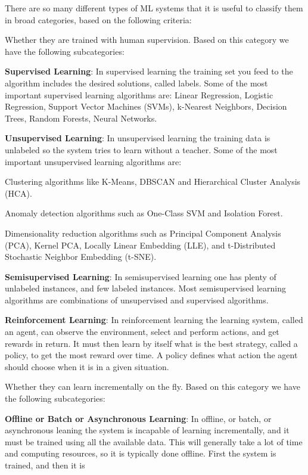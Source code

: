 There are so many different types of ML systems that it is useful to classify them in broad categories,
based on the following criteria:
\ben
\item Whether they are trained with human supervision. Based on this category we have the following
subcategories:
\bit
\item \textbf{Supervised Learning}: In supervised learning the training set you feed to the algorithm includes the
desired solutions, called labels. Some of the most important supervised learning algorithms are: Linear Regression,
Logistic Regression, Support Vector Machines (SVMs), k-Nearest Neighbors, Decision Trees, Random Forests, Neural
Networks.
\item \textbf{Unsupervised Learning}: In unsupervised learning the training data is unlabeled so the system tries to
learn without a teacher. Some of the most important unsupervised learning algorithms are:
\bit
\item Clustering algorithms like K-Means, DBSCAN and Hierarchical Cluster Analysis (HCA).
\item Anomaly detection algorithms such as One-Class SVM and Isolation Forest.
\item Dimensionality reduction algorithms such as Principal Component Analysis (PCA), Kernel PCA, Locally Linear
Embedding (LLE), and t-Distributed Stochastic Neighbor Embedding (t-SNE).
\eit
\item \textbf{Semisupervised Learning}: In semisupervised learning one has plenty of unlabeled instances, and few
labeled instances. Most semisupervised learning algorithms are combinations of unsupervised and supervised algorithms.
\item \textbf{Reinforcement Learning}: In reinforcement learning the learning system, called an agent, can observe
the environment, select and perform actions, and get rewards in return. It must then learn by itself what is the
best strategy, called a policy, to get the most reward over time. A policy defines what action the agent should
choose when it is in a given situation.
\eit
\item Whether they can learn incrementally on the fly. Based on this category we have the following
subcategories:
\bit
\item \textbf{Offline or Batch or Asynchronous Learning}: In offline, or batch, or asynchronous leaning the system is
incapable of learning incrementally, and it must be trained using all the available data. This will generally take a
lot of time and computing resources, so it is typically done offline. First the system is trained, and then it is
